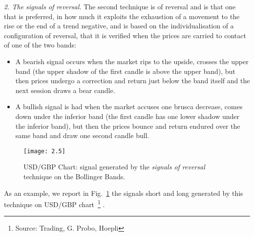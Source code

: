\noindent\textit{2. The signals of reversal.} The second technique is of reversal and is that one that is preferred, in how much it exploits the exhaustion of a movement to the rise or the end of a trend negative, and is based on the individualisation of a configuration of reversal, that it is verified when the prices are carried to contact of one of the two bands: 

\begin{itemize}
\setlength\itemsep{0.3em}
\item A bearish signal occurs when the market rips to the upside, crosses the upper band (the upper shadow of the first candle is above the upper band), but then prices undergo a correction and return just below the band itself and the next session draws a bear candle. 
\item A bullish signal is had when the market accuses one brusca decrease, comes down under the inferior band (the first candle has one lower shadow under the inferior band), but then the prices bounce and return endured over the same band and draw one second candle bull. 
\end{itemize} 

\begin{figure}[h]
\texttt{[image: 2.5]}
\centering
\caption{USD/GBP Chart: signal generated by the \textit{signals of reversal} technique on the Bollinger Bands.}
\label{fig:25} 
\end{figure}

As an example, we report in Fig.~\ref{fig:25} the signals short and long generated by this technique on USD/GBP chart~\footnote{Source: Trading, G. Probo, Hoepli} .

